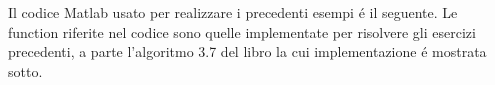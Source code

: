 \noindent Il codice Matlab usato per realizzare i precedenti esempi \'e il seguente. Le function riferite nel codice sono quelle implementate per risolvere gli esercizi precedenti, a parte l'algoritmo 3.7 del libro la cui implementazione \'e mostrata sotto.

